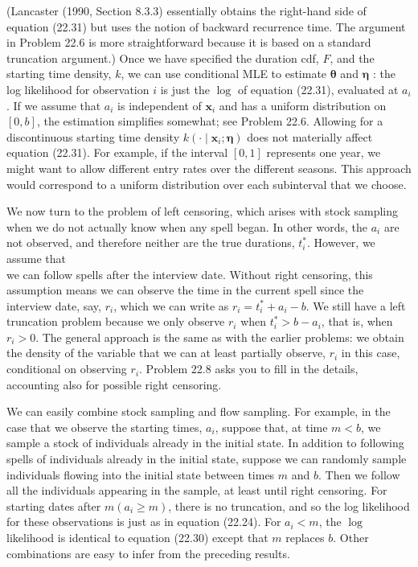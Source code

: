 \documentclass[10pt]{article}
\begin{document}
(Lancaster (1990, Section 8.3.3) essentially obtains the right-hand side of equation (22.31) but uses the notion of backward recurrence time. The argument in Problem 22.6 is more straightforward because it is based on a standard truncation argument.) Once we have specified the duration cdf, $F$, and the starting time density, $k$, we can use conditional MLE to estimate $\boldsymbol{\theta}$ and $\boldsymbol{\eta}$ : the log likelihood for observation $i$ is just the $\log$ of equation (22.31), evaluated at $a_{i}$. If we assume that $a_{i}$ is independent of $\mathbf{x}_{i}$ and has a uniform distribution on $[0, b]$, the estimation simplifies somewhat; see Problem 22.6. Allowing for a discontinuous starting time density $k\left(\cdot \mid \mathbf{x}_{i} ; \boldsymbol{\eta}\right)$ does not materially affect equation (22.31). For example, if the interval $[0,1]$ represents one year, we might want to allow different entry rates over the different seasons. This approach would correspond to a uniform distribution over each subinterval that we choose.

We now turn to the problem of left censoring, which arises with stock sampling when we do not actually know when any spell began. In other words, the $a_{i}$ are not observed, and therefore neither are the true durations, $t_{i}^{*}$. However, we assume that\\
we can follow spells after the interview date. Without right censoring, this assumption means we can observe the time in the current spell since the interview date, say, $r_{i}$, which we can write as $r_{i}=t_{i}^{*}+a_{i}-b$. We still have a left truncation problem because we only observe $r_{i}$ when $t_{i}^{*}>b-a_{i}$, that is, when $r_{i}>0$. The general approach is the same as with the earlier problems: we obtain the density of the variable that we can at least partially observe, $r_{i}$ in this case, conditional on observing $r_{i}$. Problem 22.8 asks you to fill in the details, accounting also for possible right censoring.

We can easily combine stock sampling and flow sampling. For example, in the case that we observe the starting times, $a_{i}$, suppose that, at time $m<b$, we sample a stock of individuals already in the initial state. In addition to following spells of individuals already in the initial state, suppose we can randomly sample individuals flowing into the initial state between times $m$ and $b$. Then we follow all the individuals appearing in the sample, at least until right censoring. For starting dates after $m\left(a_{i} \geq m\right)$, there is no truncation, and so the log likelihood for these observations is just as in equation (22.24). For $a_{i}<m$, the $\log$ likelihood is identical to equation (22.30) except that $m$ replaces $b$. Other combinations are easy to infer from the preceding results.
\end{document}
